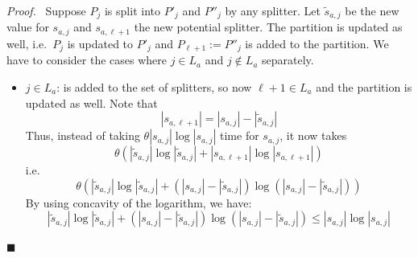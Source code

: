\documentclass[12pt, a4 paper]{article}
\renewenvironment{proof}[1][Proof]{\begin{mdframed}[backgroundcolor=black!5, topline=false, rightline=false, bottomline=false, linecolor=black!15, linewidth=3pt]{\noindent\textit{#1.}\ }}{\noindent\par\hfill$\blacksquare$\end{mdframed}}
\theoremstyle{definition}
\begin{document}
\begin{proof}
    Suppose $P_j$ is split into $P'_j$ and $P''_j$ by any splitter. Let $\tilde{s}_{a, j}$ be the new value for $s_{a, j}$ and $s_{a, \ell + 1}$ the new potential splitter. The partition is updated as well, i.e.\ $P_j$ is updated to $P'_j$ and $P_{\ell + 1} := P''_j$ is added to the partition.
    We have to consider the cases where $j \in L_a$ and $j \notin L_a$ separately.
    \begin{itemize}
        \item $j \in L_a$:  is added to the set of splitters, so now $\ell + 1 \in L_a$ and the partition is updated as well. Note that
        $$ \left| s_{a, \ell + 1} \right| = \left| s_{a, j} \right| - \left| \tilde{s}_{a, j} \right|$$
        Thus, instead of taking $\theta \left| s_{a, j} \right| \log \left| s_{a, j} \right|$ time for $s_{a, j}$, it now takes
        $$\theta \left( \left| \tilde{s}_{a, j} \right| \log \left| \tilde{s}_{a, j} \right| + \left| s_{a, \ell + 1} \right| \log \left| s_{a, \ell + 1} \right| \right)$$
        i.e.
        \begin{equation*}\label{eq:j_in_L_a}
            \theta \left( \left| \tilde{s}_{a, j} \right| \log \left| \tilde{s}_{a, j} \right| + (\left| s_{a, j} \right| - \left| \tilde{s}_{a, j} \right|) \log (\left| s_{a, j} \right| - \left| \tilde{s}_{a, j} \right|) \right)
        \end{equation*}
        By using concavity of the logarithm, we have:
        \begin{equation*}
            \left| \tilde{s}_{a, j} \right| \log \left| \tilde{s}_{a, j} \right| + (\left| s_{a, j} \right| - \left| \tilde{s}_{a, j} \right|) \log (\left| s_{a, j} \right| - \left| \tilde{s}_{a, j} \right|) \leq \left| s_{a, j} \right| \log \left| s_{a, j} \right|
        \end{equation*}


\end{itemize}
\end{proof}
\end{document}
